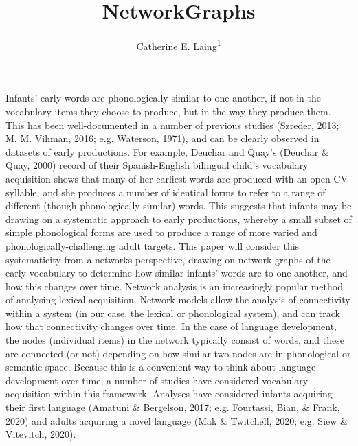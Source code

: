 \documentclass[
  man]{apa6}
\title{NetworkGraphs}
\author{Catherine E. Laing\textsuperscript{1}}
\date{}
\affiliation{\vspace{0.5cm}\textsuperscript{1} University of York, York, UK}
\begin{document}
\maketitle

Infants' early words are phonologically similar to one another, if not in the vocabulary items they choose to produce, but in the way they produce them. This has been well-documented in a number of previous studies (Szreder, 2013; M. M. Vihman, 2016; e.g. Waterson, 1971), and can be clearly observed in datasets of early productions. For example, Deuchar and Quay's (Deuchar \& Quay, 2000) record of their Spanish-English bilingual child's vocabulary acquisition shows that many of her earliest words are produced with an open CV syllable, and she produces a number of identical forms to refer to a range of different (though phonologically-similar) words. This suggests that infants may be drawing on a systematic approach to early productions, whereby a small subset of simple phonological forms are used to produce a range of more varied and phonologically-challenging adult targets. This paper will consider this systematicity from a networks perspective, drawing on network graphs of the early vocabulary to determine how similar infants' words are to one another, and how this changes over time. Network analysis is an increasingly popular method of analysing lexical acquisition. Network models allow the analysis of connectivity within a system (in our case, the lexical or phonological system), and can track how that connectivity changes over time. In the case of language development, the nodes (individual items) in the network typically consist of words, and these are connected (or not) depending on how similar two nodes are in phonological or semantic space. Because this is a convenient way to think about language development over time, a number of studies have considered vocabulary acquisition within this framework. Analyses have considered infants acquiring their first language (Amatuni \& Bergelson, 2017; e.g. Fourtassi, Bian, \& Frank, 2020) and adults acquiring a novel language (Mak \& Twitchell, 2020; e.g. Siew \& Vitevitch, 2020).
\end{document}
